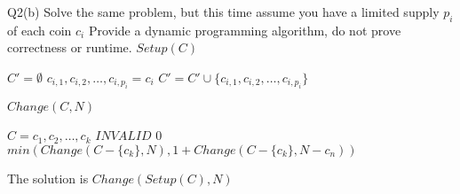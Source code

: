 \begin{problem}
  {Q2(b)}
  Solve the same problem, but this time assume you have a limited supply $p_i$ of each coin $c_i$
  Provide a dynamic programming algorithm, do not prove correctness or runtime.
  $Setup(C)$
  \begin{algorithmic}[1]
      \STATE $C' = \emptyset$
      \STATE $c_{i,1}, c_{i, 2}, \dots, c_{i, p_i} = c_i$
      \STATE $C' = C' \cup \{c_{i, 1}, c_{i, 2}, \dots, c_{i, p_i}\}$
      \ENDFOR
  \end{algorithmic}
  $Change(C, N)$
  \begin{algorithmic}[1]
      \STATE $C = c_1, c_2, \dots, c_k$
      \RETURN $INVALID$
      \ENDIF
      \RETURN $0$
      \ENDIF
      \RETURN $min(Change(C - \{c_k\}, N), 1 + Change(C - \{c_k\}, N-c_n))$
  \end{algorithmic}
  The solution is $Change(Setup(C), N)$
\end{problem}

